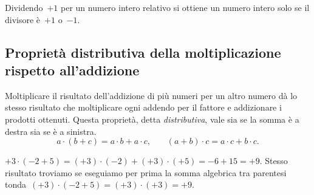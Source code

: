 Dividendo~$+1$ per un numero intero relativo si ottiene un numero intero solo se il divisore è~$+1$ o~$-1$.

\subsection{Proprietà distributiva della moltiplicazione rispetto all'addizione}
Moltiplicare il risultato dell'addizione di più numeri per un altro numero dà lo stesso risultato
che moltiplicare ogni addendo per il fattore e addizionare i prodotti ottenuti. Questa proprietà,
detta \emph{distributiva}, vale sia se la somma è a destra sia se è a sinistra.
\[a\cdot(b+c)=a\cdot b+a\cdot c\text{,}\qquad (a+b)\cdot c=a\cdot c+b\cdot c.\]

\begin{exrig}
 \begin{esempio}
 $+3\cdot(-2+5)=(+3)\cdot(-2)+(+3)\cdot(+5)=-6+15=+9$.
Stesso risultato troviamo se eseguiamo per prima la somma algebrica tra parentesi
tonda~$(+3)\cdot(-2+5)=(+3)\cdot(+3)=+9$.
 \end{esempio}

\end{exrig}

\ovalbox{\risolvii \ref{ese:2.28}, \ref{ese:2.29}}

\newpage

\cleardoublepage
